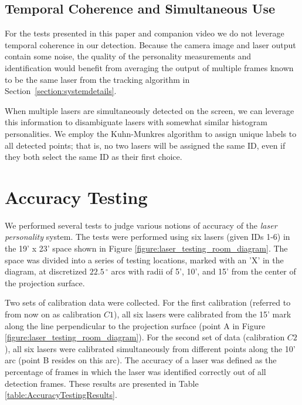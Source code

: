 \documentclass[review]{vgtc}                 %
\begin{document}
\subsection{Temporal Coherence and Simultaneous Use}

For the tests presented in this paper and companion video we do not
leverage temporal coherence in our detection.  Because the camera
image and laser output contain some noise, the quality of the
personality measurements and identification would benefit from
averaging the output of multiple frames known to be the same laser
from the tracking algorithm in Section~\ref{section:systemdetails}.

When multiple lasers are simultaneously detected on the screen, we can
leverage this information to disambiguate lasers with somewhat similar
histogram personalities.  We employ the Kuhn-Munkres algorithm to
assign unique labels to all detected points; that is, no two lasers
will be assigned the same ID, even if they both select the same ID as
their first choice.






\section{Accuracy Testing}
\label{section:TestResults}

We performed several tests to judge various notions of accuracy of the
\emph{laser personality} system. The tests were performed using six
lasers (given IDs 1-6) in the 19' x 23' space shown in Figure
\ref{figure:laser_testing_room_diagram}. The space was divided into a
series of testing locations, marked with an 'X' in the diagram, at
discretized $22.5\,^{\circ}$ arcs with radii of 5', 10', and 15' from
the center of the projection surface.

Two sets of calibration data were collected. For the first calibration
(referred to from now on as calibration $C1$), all six lasers were
calibrated from the 15' mark along the line perpendicular to the
projection surface (point A in Figure
\ref{figure:laser_testing_room_diagram}). For the second set of data
(calibration $C2$), all six lasers were calibrated simultaneously from
different points along the 10' arc (point B resides on this arc). The
accuracy of a laser was defined as the percentage of frames in which
the laser was identified correctly out of all detection frames. These
results are presented in Table \ref{table:AccuracyTestingResults}.
\end{document}
